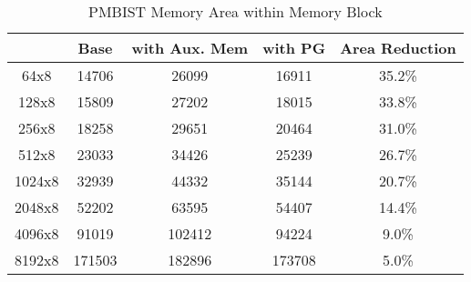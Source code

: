 \begin{table}[h]
\caption{PMBIST Memory Area within Memory Block}
\centering
\begin{tabular}{|c| c| c| c| c|}
\hline
 & Base & with Aux. Mem & with PG & Area Reduction \\
\hline
64x8   & 14706  & 26099  & 16911  & 35.2\% \\
128x8  & 15809  & 27202  & 18015  & 33.8\% \\
256x8  & 18258  & 29651  & 20464  & 31.0\% \\
512x8  & 23033  & 34426  & 25239  & 26.7\% \\
1024x8 & 32939  & 44332  & 35144  & 20.7\% \\
2048x8 & 52202  & 63595  & 54407  & 14.4\% \\
4096x8 & 91019  & 102412 & 94224  &  9.0\% \\
8192x8 & 171503 & 182896 & 173708 &  5.0\% \\ [0.5ex]
\hline
\end{tabular}
\label{tab:pg_memory_overhead}
\end{table}
  
